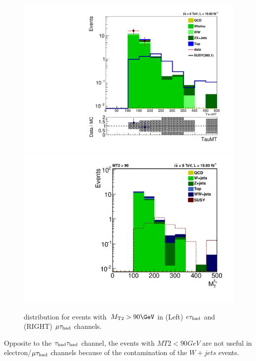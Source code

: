 \begin{figure}[htbp]
\centering
\includegraphics[angle=0,scale=0.35]{SelectionEleTau/TauMT.pdf}
\includegraphics[angle=0,scale=0.35]{SelectionMuTau/tauMT_MuTau.pdf}
\caption{\tauMT distribution for events with $\mttwo>90\GeV$ in (Left) $e\tau_{\rm had}$ and (RIGHT) $\mu\tau_{\rm had}$ channels.}
\label{fig:taumtleptontau}
\end{figure}

Opposite to the $\tau_{\rm had}\tau_{\rm had}$ channel, the events with $MT2<90 GeV$ are not useful in electron/$\mu\tau_{\rm had}$ channels because of the contamination of the $W+jets$ events.
